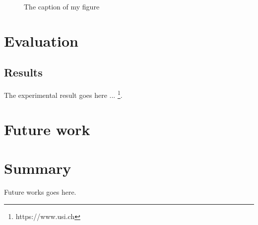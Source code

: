 \documentclass[a4paper]{usiinfbachelorproject}
\begin{document}
\begin{figure}[h!]
	\caption{The caption of my figure}\label{fig:flower}
\end{figure}




\section{\textbf{Evaluation}}
\subsection{\textbf{Results}}
The experimental result goes here ... \footnote{https://www.usi.ch}. \\







\newpage
\section{\textbf{Future work}}

\section{\textbf{Summary}}
Future works goes here.






\newpage



\end{document}
